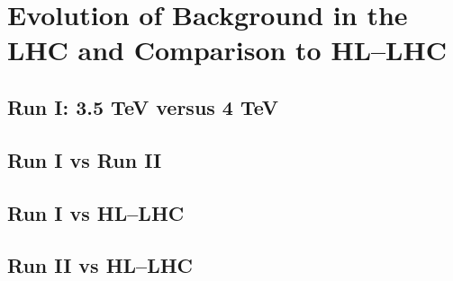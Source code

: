 \section{Evolution of Background in the LHC and Comparison to HL--LHC}
\subsection{Run I: 3.5 TeV versus 4 TeV}
\subsection{Run I vs Run II}
\subsection{Run I vs HL--LHC}
\subsection{Run II vs HL--LHC}
